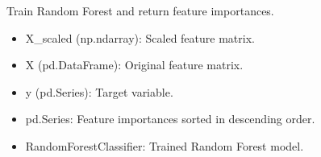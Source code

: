 \documentclass[letterpaper,10pt,english]{sphinxmanual}
\begin{document}

\begin{fulllineitems}
\label{\detokenize{eda:eda.random_forest_importance}}
\pysigstartsignatures
{}
\pysigstopsignatures
\sphinxAtStartPar
Train Random Forest and return feature importances.
\begin{description}
\begin{itemize}
\item {} 
\sphinxAtStartPar
X\_scaled (np.ndarray): Scaled feature matrix.

\item {} 
\sphinxAtStartPar
X (pd.DataFrame): Original feature matrix.

\item {} 
\sphinxAtStartPar
y (pd.Series): Target variable.

\end{itemize}

\begin{itemize}
\item {} 
\sphinxAtStartPar
pd.Series: Feature importances sorted in descending order.

\item {} 
\sphinxAtStartPar
RandomForestClassifier: Trained Random Forest model.

\end{itemize}

\end{description}

\end{fulllineitems}

\end{document}
